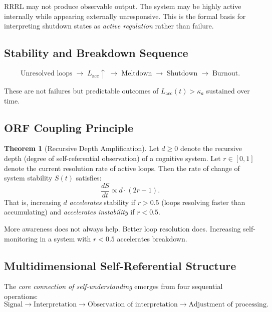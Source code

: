 \documentclass[12pt,a4paper]{article}
\theoremstyle{definition}
\newtheorem{theorem}{Theorem}[section]
\begin{document}
RRRL may not produce observable output.  The system may be highly active
internally while appearing externally unresponsive.  This is the formal
basis for interpreting shutdown states as \emph{active regulation} rather
than failure.

\subsection{Stability and Breakdown Sequence}

\begin{equation}
  \text{Unresolved loops}
  \;\to\;
  L_\mathrm{acc} \uparrow
  \;\to\;
  \text{Meltdown}
  \;\to\;
  \text{Shutdown}
  \;\to\;
  \text{Burnout}.
\end{equation}

These are not failures but predictable outcomes of
$L_\mathrm{acc}(t) > \kappa_a$ sustained over time.

\subsection{ORF Coupling Principle}

\begin{theorem}[Recursive Depth Amplification]
  Let $d \geq 0$ denote the recursive depth (degree of self-referential
  observation) of a cognitive system.  Let $r \in [0,1]$ denote the
  current resolution rate of active loops.  Then the rate of change of
  system stability $S(t)$ satisfies:
  \begin{equation}\label{eq:coupling}
    \frac{dS}{dt} \propto d \cdot (2r - 1).
  \end{equation}
  That is, increasing $d$ \emph{accelerates} stability if $r > 0.5$
  (loops resolving faster than accumulating) and \emph{accelerates
  instability} if $r < 0.5$.
\end{theorem}

\begin{tcolorbox}[warning,title={Critical Warning}]
  More awareness does not always help.
  Better loop resolution does.  Increasing self-monitoring in a system
  with $r < 0.5$ accelerates breakdown.
\end{tcolorbox}

\subsection{Multidimensional Self-Referential Structure}

The \emph{core connection of self-understanding} emerges from four
sequential operations:
\begin{equation}
  \text{Signal} \to \text{Interpretation} \to
  \text{Observation of interpretation} \to
  \text{Adjustment of processing}.
\end{equation}
\end{document}
